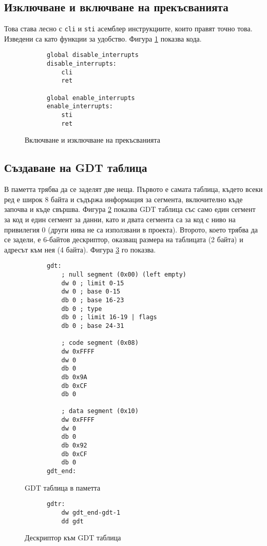   \subsection{Изключване и включване на прекъсванията}
  Това става лесно с {\tt cli} и {\tt sti} асемблер инструкциите, които правят точно това. Изведени са като функции за удобство. Фигура \ref{fig:interrupt-disable} показва кода.

  \begin{figure}[htpb]
    \centering
    \caption{Включване и изключване на прекъсванията}
    \begin{verbatim}
      global disable_interrupts
      disable_interrupts:
          cli
          ret

      global enable_interrupts
      enable_interrupts:
          sti
          ret
    \end{verbatim}
    \label{fig:interrupt-disable}
  \end{figure}

  \subsection{Създаване на GDT таблица}
  В паметта трябва да се заделят две неща. Първото е самата таблица, където всеки ред е широк 8 байта и съдържа информация за сегмента, включително къде започва и къде свършва. Фигура \ref{fig:gdt} показва GDT таблица със само един сегмент за код и един сегмент за данни, като и двата сегмента са за код с ниво на привилегия 0 (други нива не са използвани в проекта). Второто, което трябва да се задели, е 6-байтов дескриптор, оказващ размера на таблицата (2 байта) и адресът към нея (4 байта). Фигура \ref{fig:gdtr} го показва.

  \begin{figure}[htpb]
    \centering
    \begin{verbatim}
      gdt:
          ; null segment (0x00) (left empty)
          dw 0 ; limit 0-15
          dw 0 ; base 0-15
          db 0 ; base 16-23
          db 0 ; type
          db 0 ; limit 16-19 | flags
          db 0 ; base 24-31

          ; code segment (0x08)
          dw 0xFFFF
          dw 0
          db 0
          db 0x9A
          db 0xCF
          db 0

          ; data segment (0x10)
          dw 0xFFFF
          dw 0
          db 0
          db 0x92
          db 0xCF
          db 0
      gdt_end:
    \end{verbatim}
    \caption{GDT таблица в паметта}
    \label{fig:gdt}
  \end{figure}
  \begin{figure}[htpb]
    \centering
    \begin{verbatim}
      gdtr:
          dw gdt_end-gdt-1
          dd gdt
    \end{verbatim}
    \caption{Дескриптор към GDT таблица}
    \label{fig:gdtr}
  \end{figure}

